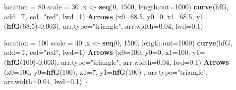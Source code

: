 \documentclass[12pt,twoside]{reedthesis}
\newenvironment{Shaded}{\begin{snugshade}}{\end{snugshade}}
\newcommand{\DataTypeTok}[1]{\textcolor[rgb]{0.13,0.29,0.53}{#1}}
\newcommand{\DecValTok}[1]{\textcolor[rgb]{0.00,0.00,0.81}{#1}}
\newcommand{\FloatTok}[1]{\textcolor[rgb]{0.00,0.00,0.81}{#1}}
\newcommand{\KeywordTok}[1]{\textcolor[rgb]{0.13,0.29,0.53}{\textbf{#1}}}
\newcommand{\NormalTok}[1]{#1}
\newcommand{\OperatorTok}[1]{\textcolor[rgb]{0.81,0.36,0.00}{\textbf{#1}}}
\newcommand{\StringTok}[1]{\textcolor[rgb]{0.31,0.60,0.02}{#1}}
\begin{document}
\begin{Shaded}
\begin{Highlighting}[]
\NormalTok{  location =}\StringTok{ }\DecValTok{80}
\NormalTok{  scale =}\StringTok{ }\DecValTok{30}
\NormalTok{  .x <-}\StringTok{ }\KeywordTok{seq}\NormalTok{(}\DecValTok{0}\NormalTok{, }\DecValTok{1500}\NormalTok{, }\DataTypeTok{length.out=}\DecValTok{1000}\NormalTok{)}
  \KeywordTok{curve}\NormalTok{(hfG, }\DataTypeTok{add=}\NormalTok{T, }\DataTypeTok{col=}\StringTok{"red"}\NormalTok{, }\DataTypeTok{lwd=}\DecValTok{1}\NormalTok{)}
  \KeywordTok{Arrows}\NormalTok{ (}\DataTypeTok{x0=}\FloatTok{68.5}\NormalTok{, }\DataTypeTok{y0=}\DecValTok{0}\NormalTok{, }\DataTypeTok{x1=}\FloatTok{68.5}\NormalTok{, }\DataTypeTok{y1=}\NormalTok{(}\KeywordTok{hfG}\NormalTok{(}\FloatTok{68.5}\NormalTok{)}\OperatorTok{-}\FloatTok{0.003}\NormalTok{), }\DataTypeTok{arr.type=}\StringTok{"triangle"}\NormalTok{, }\DataTypeTok{arr.width=}\FloatTok{0.04}\NormalTok{, }\DataTypeTok{lwd=}\FloatTok{0.1}\NormalTok{)}
  
\NormalTok{  location =}\StringTok{ }\DecValTok{100}
\NormalTok{  scale =}\StringTok{ }\DecValTok{40}
\NormalTok{  .x <-}\StringTok{ }\KeywordTok{seq}\NormalTok{(}\DecValTok{0}\NormalTok{, }\DecValTok{1500}\NormalTok{, }\DataTypeTok{length.out=}\DecValTok{1000}\NormalTok{)}
  \KeywordTok{curve}\NormalTok{(hfG, }\DataTypeTok{add=}\NormalTok{T, }\DataTypeTok{col=}\StringTok{"red"}\NormalTok{, }\DataTypeTok{lwd=}\DecValTok{1}\NormalTok{)}
  \KeywordTok{Arrows}\NormalTok{ (}\DataTypeTok{x0=}\DecValTok{100}\NormalTok{, }\DataTypeTok{y0=}\DecValTok{0}\NormalTok{, }\DataTypeTok{x1=}\DecValTok{100}\NormalTok{, }\DataTypeTok{y1=}\NormalTok{(}\KeywordTok{hfG}\NormalTok{(}\DecValTok{100}\NormalTok{)}\OperatorTok{-}\FloatTok{0.003}\NormalTok{), }\DataTypeTok{arr.type=}\StringTok{"triangle"}\NormalTok{, }\DataTypeTok{arr.width=}\FloatTok{0.04}\NormalTok{, }\DataTypeTok{lwd=}\FloatTok{0.1}\NormalTok{)}
  \KeywordTok{Arrows}\NormalTok{ (}\DataTypeTok{x0=}\DecValTok{100}\NormalTok{, }\DataTypeTok{y0=}\KeywordTok{hfG}\NormalTok{(}\DecValTok{100}\NormalTok{), }\DataTypeTok{x1=}\DecValTok{7}\NormalTok{, }\DataTypeTok{y1=}\KeywordTok{hfG}\NormalTok{(}\DecValTok{100}\NormalTok{) , }\DataTypeTok{arr.type=}\StringTok{"triangle"}\NormalTok{, }\DataTypeTok{arr.width=}\FloatTok{0.04}\NormalTok{, }\DataTypeTok{lwd=}\FloatTok{0.1}\NormalTok{)}
\NormalTok{\}}


\end{Highlighting}
\end{Shaded}
\end{document}
